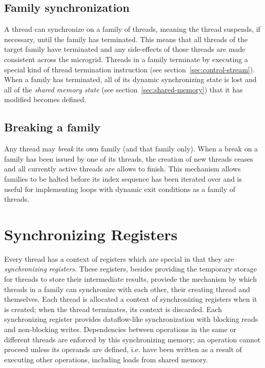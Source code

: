 \subsection{\label{sec:synchronization}Family synchronization}

A thread can synchronize on a family of threads, meaning the thread suspends, if necessary, until the family has terminated. This means that all threads of the target family have terminated and any side-effects of those threads are made consistent across the microgrid. Threads in a family terminate by executing a special kind of thread termination instruction (see section~\ref{sec:control-stream}). When a family has terminated, all of its dynamic synchronizing state is lost and all of the \emph{shared memory state} (see section~\ref{sec:shared-memory}) that it has modified becomes defined. 

\subsection{Breaking a family}

Any thread may \emph{break} its own family (and that family only). When a break on a family has been issued by one of its threads, the creation of new threads ceases and all currently active threads are allows to finish. This mechanism allows families to be halted before its index sequence has been iterated over and is useful for implementing loops with dynamic exit conditions as a family of threads.

\section{Synchronizing Registers}

Every thread has a context of registers which are special in that they are \emph{synchronizing registers}. These registers, besides providing the temporary storage for threads to store their intermediate results, proviede the mechanism by which threads in a family can synchronize with each other, their creating thread and themselves. Each thread is allocated a context of synchronizing registers when it is created; when the thread terminates, its context is discarded. Each synchronizing register provides dataflow-like synchronization with blocking reads and non-blocking writes. Dependencies between operations in the same or different threads are enforced by this synchronizing memory; an operation cannot proceed unless its operands are defined, i.e. have been written as a result of executing other operations, including loads from shared memory.

